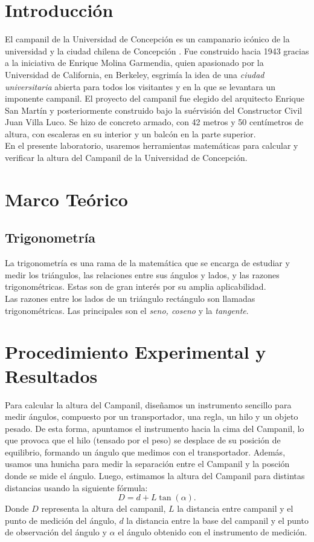 \documentclass[10pt,a4paper]{article}
\begin{document}
	\begin{multicols}{2}
		\section{Introducción}
			El campanil de la Universidad de Concepción es un campanario icónico de la universidad y la ciudad chilena de Concepción \cite{wikicamp}. Fue construido hacia 1943 gracias a la iniciativa de Enrique Molina Garmendia, quien apasionado por la Universidad de California, en Berkeley, esgrimía la idea de una \emph{ciudad universitaria} abierta para todos los visitantes y en la que se levantara un imponente campanil. El proyecto del campanil fue elegido del arquitecto Enrique San Martín y posteriormente construido bajo la suérvisión del Constructor Civil Juan Villa Luco. Se hizo de concreto armado, con 42 metros y 50 centímetros de altura, con escaleras en su interior y un balcón en la parte superior.\\
			En el presente laboratorio, usaremos herramientas matemáticas para calcular y verificar la altura del Campanil de la Universidad de Concepción.
		\section{Marco Teórico}
		\subsection{Trigonometría}
		La trigonometría es una rama de la matemática que se encarga de estudiar y medir los triángulos, las relaciones entre sus ángulos y lados, y las razones trigonométricas. Estas son de gran interés por su amplia aplicabilidad.\\
		Las razones entre los lados de un triángulo rectángulo son llamadas trigonométricas. Las principales son el \emph{seno, coseno} y la \emph{tangente}.\\
		\section{Procedimiento Experimental y Resultados}
		Para calcular la altura del Campanil, diseñamos un instrumento sencillo para medir ángulos, compuesto por un transportador, una regla, un hilo y un objeto pesado. De esta forma, apuntamos el instrumento hacia la cima del Campanil, lo que provoca que el hilo (tensado por el peso) se desplace de su posición de equilibrio, formando un ángulo que medimos con el transportador. Además, usamos una hunicha para medir la separación entre el Campanil y la posción donde se mide el ángulo. Luego, estimamos la altura del Campanil para distintas distancias usando la siguiente fórmula:
		\begin{equation}\label{Ec. altura}
		D = d + L \tan(\alpha).
		\end{equation}
		Donde $D$ representa la altura del campanil, $L$ la distancia entre campanil y el punto de medición del ángulo, $d$ la distancia entre la base del campanil y el punto de observación del ángulo y $\alpha$ el ángulo obtenido con el instrumento de medición.
		

\end{multicols}
\end{document}
